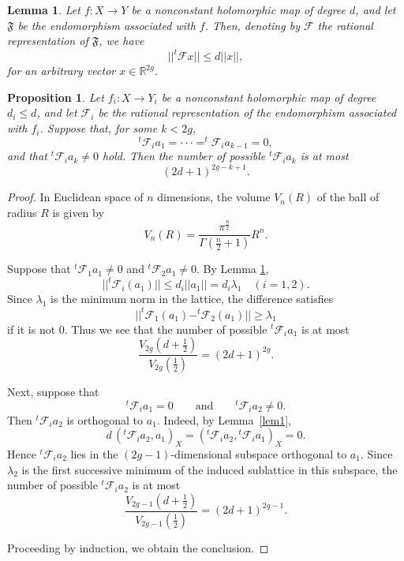 \documentclass[10pt,a4paper]{amsart}
\newtheorem{lemma}{Lemma}
\newtheorem{proposition}{Proposition}
\begin{document}
 \begin{lemma} \label{lem2} 
 Let $f:X\rightarrow Y$ be a nonconstant holomorphic map of degree $d$, and let $\mathfrak{F}$ be the endomorphism associated with $f$. 
 Then, denoting by $\mathcal{F}$ the rational representation of $\mathfrak{F}$, we have
\begin{equation}
||^{t}\mathcal{F}x||\le d||x||, 
\end{equation}
for an arbitrary vector $x\in\mathbb{R}^{2g}$.
\end{lemma}

\begin{proposition}\label{prop}
Let $f_{i}:X\rightarrow Y_{i}$ be a nonconstant holomorphic map of degree $d_i\leq d$, 
and let $\mathcal{F}_{i}$ be the rational representation of the endomorphism associated with $f_{i}$.  Suppose that, for some $k<2g$,
\begin{equation*}
{}^{t}\mathcal{F}_{i}a_{1}=\cdot\cdot\cdot=^{t}\mathcal{F}_{i}a_{k-1}=0, 
\end{equation*}
and that  $^{t}\mathcal{F}_{i}a_{k}\ne 0$ hold.  Then the number of possible $^{t}\mathcal{F}_{i}a_{k}$
is at most 
$$
(2d+1)^{2g-k+1}.
$$
\end{proposition}

\begin{proof}
In Euclidean space of $n$ dimensions, the volume $V_n(R)$ of the ball of radius $R$ is given by
$$
V_n(R)=\frac{\pi^{\frac{n}{2}}}{\Gamma (\frac{n}{2}+1)}R^n .
$$

Suppose that $^{t}\mathcal{F}_{1}a_{1}\ne 0$ and $^{t}\mathcal{F}_{2}a_{1}\ne 0$.
By Lemma {\ref{lem2}}, 
$$||^{t}\mathcal{F}_i (a_1 )||\le d_i ||a_1 ||=d_i \lambda_1 \quad (i=1,2).
$$
Since $\lambda_1$ is the minimum norm in the lattice, the difference  satisfies
$$||^{t}\mathcal{F}_1 (a_1 )-^{t}\mathcal{F}_2 (a_1 )||\ge \lambda_1
$$ if it is not $0$.
Thus we see that the number of possible $^{t}\mathcal{F}_{i}a_{1}$
is at most 
$$
\frac{V_{2g} \left( d+\frac1{2} \right) }{V_{2g} \left( \frac1{2} \right)}
=(2d+1)^{2g}.
$$

Next, suppose that
$$
{}^{t}\mathcal{F}_{i}a_{1}=0
\qquad\text{and}\qquad
{}^{t}\mathcal{F}_{i}a_{2}\neq 0.
$$
Then
$
{}^{t}\mathcal{F}_{i}a_{2}
$
is orthogonal to \(a_{1}\). Indeed, by Lemma~\ref{lem1},
$$
d\,({}^{t}\mathcal{F}_{i}a_{2},a_{1})_X
=
({}^{t}\mathcal{F}_{i}a_{2},{}^{t}\mathcal{F}_{i}a_{1})_X
=
0.
$$
Hence
$
{}^{t}\mathcal{F}_{i}a_{2}
$
lies in the \((2g-1)\)-dimensional subspace orthogonal to $a_{1}$.
Since \(\lambda_{2}\) is the first successive minimum of the induced
sublattice in this subspace, 
the number of possible $^{t}\mathcal{F}_{i}a_{2}$
is at most 
$$
\frac{V_{2g-1} \left( d+\frac1{2} \right) }{V_{2g-1} \left( \frac1{2} \right)}
=(2d+1)^{2g-1}.
$$

Proceeding by induction, we obtain the conclusion.
\end{proof}
\end{document}
